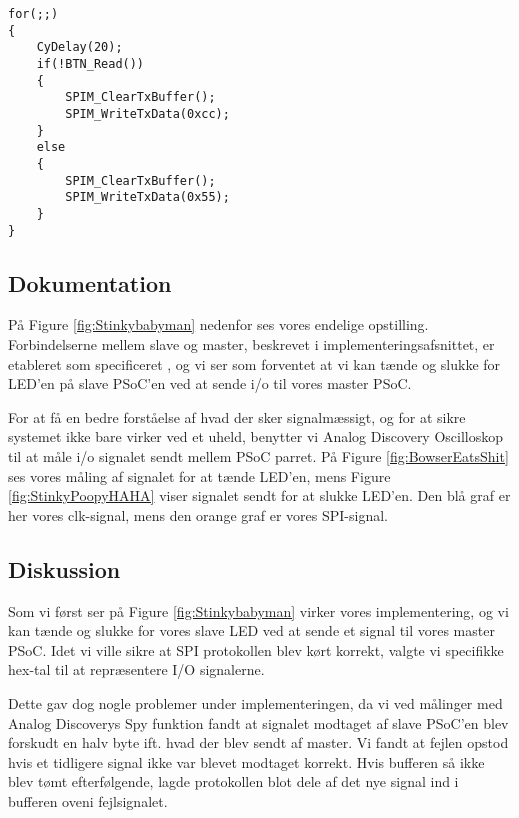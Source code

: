 \documentclass[../main.tex]{subfiles}
\begin{document}
\begin{lstlisting}[caption={Håndtering af knappens input på SPI Master - med knap}, label=lst:spi_master_btn]
for(;;)
{
    CyDelay(20);
    if(!BTN_Read())
    {
        SPIM_ClearTxBuffer();
        SPIM_WriteTxData(0xcc); 
    }
    else
    {
        SPIM_ClearTxBuffer();
        SPIM_WriteTxData(0x55);
    }
}
\end{lstlisting}

\subsection{Dokumentation}
På Figure \ref{fig:Stinkybabyman} nedenfor ses vores endelige opstilling. Forbindelserne mellem slave og master, beskrevet i implementeringsafsnittet, er etableret som specificeret
, og vi ser som forventet at vi kan tænde og slukke for LED'en på slave PSoC'en ved at sende i/o til vores master PSoC.


For at få en bedre forståelse af hvad der sker signalmæssigt, og for at sikre systemet ikke bare virker ved et uheld, benytter vi Analog Discovery Oscilloskop til at måle  i/o signalet sendt mellem PSoC parret.
 På Figure \ref{fig:BowserEatsShit} ses vores måling af signalet for at tænde LED'en, mens Figure \ref{fig:StinkyPoopyHAHA} viser signalet sendt for at slukke LED'en. Den blå graf er her 
 vores clk-signal, mens den orange graf er vores SPI-signal. 

 
\subsection{Diskussion}
Som vi først ser på Figure \ref{fig:Stinkybabyman} virker vores implementering, og vi kan tænde og slukke for vores slave LED ved at sende et signal til vores master PSoC.
Idet vi ville sikre at SPI protokollen blev kørt korrekt, valgte vi specifikke hex-tal til at repræsentere I/O signalerne. 

Dette gav dog nogle problemer under implementeringen, da vi ved målinger med Analog Discoverys Spy funktion fandt at signalet modtaget af slave PSoC'en blev forskudt en halv byte 
ift. hvad der blev sendt af master. Vi fandt at fejlen opstod hvis et tidligere signal ikke var blevet modtaget korrekt. Hvis bufferen så ikke blev tømt efterfølgende, lagde protokollen 
blot dele af det nye signal ind i bufferen oveni fejlsignalet.
\end{document}
